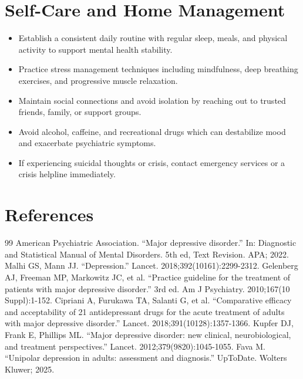 \section*{Self-Care and Home Management}
\begin{itemize}
  \item Establish a consistent daily routine with regular sleep, meals, and physical activity to support mental health stability.
  \item Practice stress management techniques including mindfulness, deep breathing exercises, and progressive muscle relaxation.
  \item Maintain social connections and avoid isolation by reaching out to trusted friends, family, or support groups.
  \item Avoid alcohol, caffeine, and recreational drugs which can destabilize mood and exacerbate psychiatric symptoms.
  \item If experiencing suicidal thoughts or crisis, contact emergency services or a crisis helpline immediately.
\end{itemize}

\section*{References}
\begin{thebibliography}{99}
 American Psychiatric Association. ``Major depressive disorder.'' In: Diagnostic and Statistical Manual of Mental Disorders. 5th ed, Text Revision. APA; 2022.
 Malhi GS, Mann JJ. ``Depression.'' Lancet. 2018;392(10161):2299-2312.
 Gelenberg AJ, Freeman MP, Markowitz JC, et al. ``Practice guideline for the treatment of patients with major depressive disorder.'' 3rd ed. Am J Psychiatry. 2010;167(10 Suppl):1-152.
 Cipriani A, Furukawa TA, Salanti G, et al. ``Comparative efficacy and acceptability of 21 antidepressant drugs for the acute treatment of adults with major depressive disorder.'' Lancet. 2018;391(10128):1357-1366.
 Kupfer DJ, Frank E, Phillips ML. ``Major depressive disorder: new clinical, neurobiological, and treatment perspectives.'' Lancet. 2012;379(9820):1045-1055.
 Fava M. ``Unipolar depression in adults: assessment and diagnosis.'' UpToDate. Wolters Kluwer; 2025.
\end{thebibliography}

